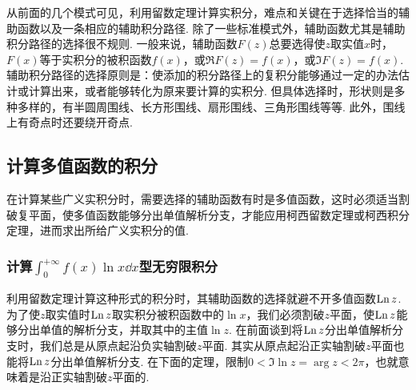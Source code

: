 从前面的几个模式可见，利用留数定理计算实积分，难点和关键在于选择恰当的辅助函数以及一条相应的辅助积分路径.
除了一些标准模式外，辅助函数尤其是辅助积分路径的选择很不规则.
一般来说，辅助函数\(F(z)\)总要选得使\(z\)取实值\(x\)时，\(F(x)\)等于实积分的被积函数\(f(x)\)，或\(\Re{F(z)} = f(x)\)，或\(\Im{F(z)} = f(x)\).
辅助积分路径的选择原则是：使添加的积分路径上的复积分能够通过一定的办法估计或计算出来，或者能够转化为原来要计算的实积分.
但具体选择时，形状则是多种多样的，有半圆周围线、长方形围线、扇形围线、三角形围线等等.
此外，围线上有奇点时还要绕开奇点.

\subsection{计算多值函数的积分}
在计算某些广义实积分时，需要选择的辅助函数有时是多值函数，这时必须适当割破复平面，使多值函数能够分出单值解析分支，才能应用柯西留数定理或柯西积分定理，进而求出所给广义实积分的值.

\subsubsection{计算\texorpdfstring{\(\int_0^{+\infty} f(x) \ln x \dd{x}\)型}{含有对数函数的}无穷限积分}
利用留数定理计算这种形式的积分时，其辅助函数的选择就避不开多值函数\(\operatorname{Ln} z\).
为了使\(z\)取实值时\(\operatorname{Ln} z\)取实积分被积函数中的\(\ln x\)，我们必须割破\(z\)平面，使\(\operatorname{Ln} z\)能够分出单值的解析分支，并取其中的主值\(\ln z\).
在前面谈到将\(\operatorname{Ln} z\)分出单值解析分支时，我们总是从原点起沿负实轴割破\(z\)平面.
其实从原点起沿正实轴割破\(z\)平面也能将\(\operatorname{Ln} z\)分出单值解析分支.
在下面的定理，限制\(0 < \Im \ln z = \arg z < 2\pi\)，也就意味着是沿正实轴割破\(z\)平面的.

